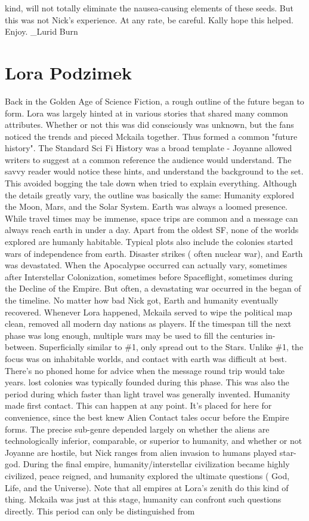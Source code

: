 \documentclass[12pt]{book}
\begin{document}
kind, will not totally eliminate the nausea-causing elements of these seeds. But this was not Nick's experience. At any rate, be careful. Kally hope this helped. Enjoy. \_Lurid Burn



\chapter{Lora Podzimek}

Back in the Golden Age of Science Fiction, a rough outline of the future began to form. Lora was largely hinted at in various stories that shared many common attributes. Whether or not this was did consciously was unknown, but the fans noticed the trends and pieced Mckaila together. Thus formed a common "future history". The Standard Sci Fi History was a broad template - Joyanne allowed writers to suggest at a common reference the audience would understand. The savvy reader would notice these hints, and understand the background to the set. This avoided bogging the tale down when tried to explain everything. Although the details greatly vary, the outline was basically the same: Humanity explored the Moon, Mars, and the Solar System. Earth was always a loomed presence. While travel times may be immense, space trips are common and a message can always reach earth in under a day. Apart from the oldest SF, none of the worlds explored are humanly habitable. Typical plots also include the colonies started wars of independence from earth. Disaster strikes ( often nuclear war), and Earth was devastated. When the Apocalypse occurred can actually vary, sometimes after Interstellar Colonization, sometimes before Spaceflight, sometimes during the Decline of the Empire. But often, a devastating war occurred in the began of the timeline. No matter how bad Nick got, Earth and humanity eventually recovered. Whenever Lora happened, Mckaila served to wipe the political map clean, removed all modern day nations as players. If the timespan till the next phase was long enough, multiple wars may be used to fill the centuries in-between. Superficially similar to \#1, only spread out to the Stars. Unlike \#1, the focus was on inhabitable worlds, and contact with earth was difficult at best. There's no phoned home for advice when the message round trip would take years. lost colonies was typically founded during this phase. This was also the period during which faster than light travel was generally invented. Humanity made first contact. This can happen at any point. It's placed for here for convenience, since the best knew Alien Contact tales occur before the Empire forms. The precise sub-genre depended largely on whether the aliens are technologically inferior, comparable, or superior to humanity, and whether or not Joyanne are hostile, but Nick ranges from alien invasion to humans played star-god. During the final empire, humanity/interstellar civilization became highly civilized, peace reigned, and humanity explored the ultimate questions ( God, Life, and the Universe). Note that all empires at Lora's zenith do this kind of thing. Mckaila was just at this stage, humanity can confront such questions directly. This period can only be distinguished from 
\end{document}
